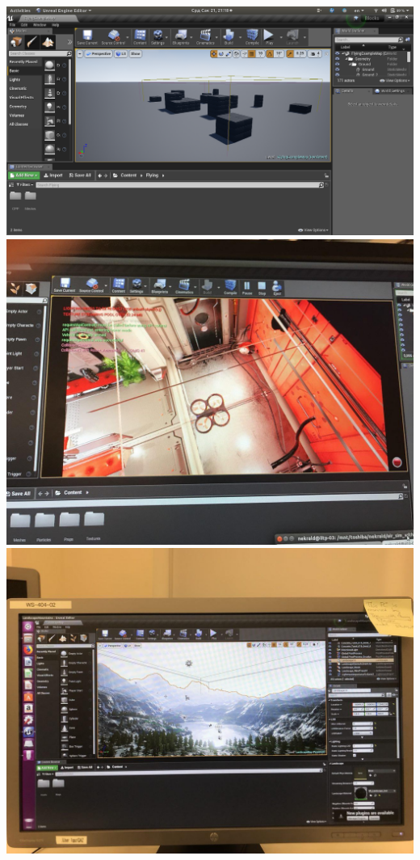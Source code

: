 \documentclass{article}
\begin{document}
 \includegraphics[scale=0.1]{environments/blocks.png}
 \includegraphics[scale=0.1]{environments/corridor.jpg}
 \includegraphics[scale=0.1]{environments/landscape.jpg}
\end{document}
